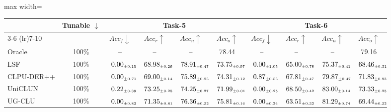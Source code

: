 \begin{table}[!htbp]
\begin{adjustbox}{max width=\textwidth}
\begin{tabular}{l|c|cccc|cccc}
\midrule
\addlinespace[0.05cm]
\midrule
\multirow{2}{*}{\textbf{Method}} & \multirow{2}{*}{\textbf{Tunable} $\downarrow$}
& \multicolumn{4}{c|}{\textbf{Task-5}} & \multicolumn{4}{c}{\textbf{Task-6}} \\
\cmidrule(lr){3-6} \cmidrule(lr){7-10}
& & $Acc_f \downarrow$ & $Acc_r \uparrow$ & $Acc_n \uparrow$ & $Acc_o \uparrow$
& $Acc_f \downarrow$ & $Acc_r \uparrow$ & $Acc_n \uparrow$ & $Acc_o \uparrow$ \\
\midrule
Oracle        & 100\% & -- & -- & -- & 78.44 & -- & -- & -- & 79.16 \\
\midrule
LSF & 100\% & $\kern6pt0.00_{\scriptscriptstyle \pm 0.15}\kern-6pt$ & $\kern6pt68.98_{\scriptscriptstyle \pm 0.26}\kern-6pt$ & \colorbox{green!25}{$\kern6pt78.91_{\scriptscriptstyle \pm 0.47}\kern-6pt$} & $\kern6pt73.75_{\scriptscriptstyle \pm 0.97}\kern-6pt$ & $\kern6pt0.00_{\scriptscriptstyle \pm 1.05}\kern-6pt$ & $\kern6pt65.00_{\scriptscriptstyle \pm 0.78}\kern-6pt$ & $\kern6pt75.37_{\scriptscriptstyle \pm 0.41}\kern-6pt$ & $\kern6pt68.46_{\scriptscriptstyle \pm 0.31}\kern-6pt$ \\
CLPU-DER++ & 100\% & $\kern6pt0.00_{\scriptscriptstyle \pm 0.71}\kern-6pt$ & $\kern6pt69.00_{\scriptscriptstyle \pm 0.14}\kern-6pt$ & $\kern6pt75.89_{\scriptscriptstyle \pm 0.25}\kern-6pt$ & $\kern6pt74.31_{\scriptscriptstyle \pm 0.12}\kern-6pt$ & $\kern6pt0.87_{\scriptscriptstyle \pm 0.55}\kern-6pt$ & $\kern6pt67.81_{\scriptscriptstyle \pm 0.47}\kern-6pt$ & $\kern6pt79.87_{\scriptscriptstyle \pm 0.47}\kern-6pt$ & $\kern6pt71.83_{\scriptscriptstyle \pm 0.93}\kern-6pt$ \\
UniCLUN & 100\% & $\kern6pt0.22_{\scriptscriptstyle \pm 0.39}\kern-6pt$ & \colorbox{green!25}{$\kern6pt73.25_{\scriptscriptstyle \pm 0.25}\kern-6pt$} & $\kern6pt74.25_{\scriptscriptstyle \pm 0.27}\kern-6pt$ & $\kern6pt71.99_{\scriptscriptstyle \pm 0.01}\kern-6pt$ & $\kern6pt0.00_{\scriptscriptstyle \pm 0.25}\kern-6pt$ & \colorbox{yellow!35}{$\kern6pt68.50_{\scriptscriptstyle \pm 0.42}\kern-6pt$} & \colorbox{green!25}{$\kern6pt83.00_{\scriptscriptstyle \pm 0.14}\kern-6pt$} & \colorbox{green!25}{$\kern6pt73.33_{\scriptscriptstyle \pm 0.25}\kern-6pt$} \\
UG-CLU & 100\% & $\kern6pt0.00_{\scriptscriptstyle \pm 0.83}\kern-6pt$ & $\kern6pt71.35_{\scriptscriptstyle \pm 0.81}\kern-6pt$ & $\kern6pt76.36_{\scriptscriptstyle \pm 0.32}\kern-6pt$ & \colorbox{green!25}{$\kern6pt75.81_{\scriptscriptstyle \pm 0.16}\kern-6pt$} & $\kern6pt0.00_{\scriptscriptstyle \pm 0.24}\kern-6pt$ & $\kern6pt63.51_{\scriptscriptstyle \pm 0.32}\kern-6pt$ & \colorbox{yellow!35}{$\kern6pt81.29_{\scriptscriptstyle \pm 0.74}\kern-6pt$} & $\kern6pt69.44_{\scriptscriptstyle \pm 0.32}\kern-6pt$ \\

\end{tabular}
\end{adjustbox}
\end{table}
